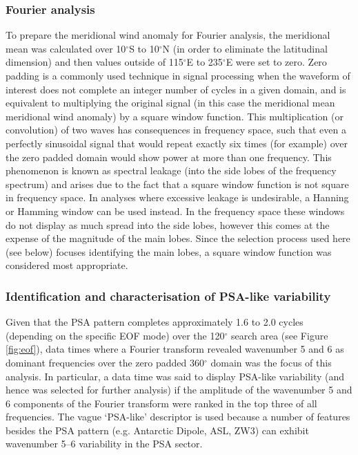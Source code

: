 \subsubsection{Fourier analysis}

To prepare the meridional wind anomaly for Fourier analysis, the meridional mean was calculated over 10$^{\circ}$S to 10$^{\circ}$N (in order to eliminate the latitudinal dimension) and then values outside of 115$^{\circ}$E to 235$^{\circ}$E were set to zero. Zero padding is a commonly used technique in signal processing when the waveform of interest does not complete an integer number of cycles in a given domain, and is equivalent to multiplying the original signal (in this case the meridional mean meridional wind anomaly) by a square window function. This multiplication (or convolution) of two waves has consequences in frequency space, such that even a perfectly sinusoidal signal that would repeat exactly six times (for example) over the zero padded domain would show power at more than one frequency. This phenomenon is known as spectral leakage (into the side lobes of the frequency spectrum) and arises due to the fact that a square window function is not square in frequency space. In analyses where excessive leakage is undesirable, a Hanning or Hamming window can be used instead. In the frequency space these windows do not display as much spread into the side lobes, however this comes at the expense of the magnitude of the main lobes. Since the selection process used here (see below) focuses identifying the main lobes, a square window function was considered most appropriate.

\subsubsection{Identification and characterisation of PSA-like variability}

Given that the PSA pattern completes approximately 1.6 to 2.0 cycles (depending on the specific EOF mode) over the 120$^{\circ}$ search area (see Figure \ref{fig:eof}), data times where a Fourier transform revealed wavenumber 5 and 6 as dominant frequencies over the zero padded 360$^{\circ}$ domain was the focus of this analysis. In particular, a data time was said to display PSA-like variability (and hence was selected for further analysis) if the amplitude of the wavenumber 5 and 6 components of the Fourier transform were ranked in the top three of all frequencies. The vague `PSA-like' descriptor is used because a number of features besides the PSA pattern (e.g. Antarctic Dipole, ASL, ZW3) can exhibit wavenumber 5--6 variability in the PSA sector.

